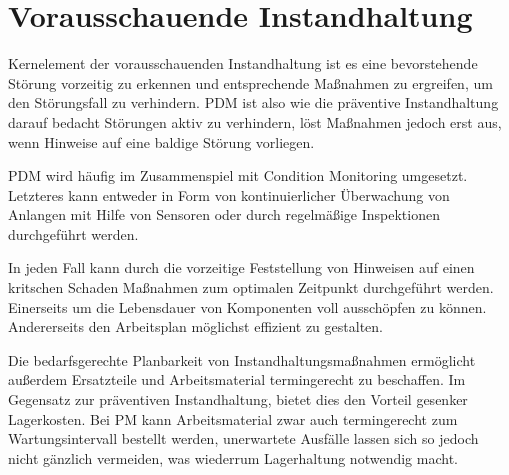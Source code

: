 \chapter{Vorausschauende Instandhaltung}
\label{ch:vorausschauende instandhaltung}

Kernelement der vorausschauenden Instandhaltung ist es eine bevorstehende Störung vorzeitig zu erkennen und entsprechende Maßnahmen zu ergreifen, um den Störungsfall zu verhindern. PDM ist also wie die präventive Instandhaltung darauf bedacht Störungen aktiv zu verhindern, löst Maßnahmen jedoch erst aus, wenn Hinweise auf eine baldige Störung vorliegen.

PDM wird häufig im Zusammenspiel mit Condition Monitoring umgesetzt. Letzteres kann entweder in Form von kontinuierlicher Überwachung von Anlangen mit Hilfe von Sensoren oder durch regelmäßige Inspektionen durchgeführt werden.

In jeden Fall kann durch die vorzeitige Feststellung von Hinweisen auf einen kritschen Schaden Maßnahmen zum optimalen Zeitpunkt durchgeführt werden. Einerseits um die Lebensdauer von Komponenten voll ausschöpfen zu können. Andererseits den Arbeitsplan möglichst effizient zu gestalten.

Die bedarfsgerechte Planbarkeit von Instandhaltungsmaßnahmen ermöglicht außerdem Ersatzteile und Arbeitsmaterial termingerecht zu beschaffen. Im Gegensatz zur präventiven Instandhaltung, bietet dies den Vorteil gesenker Lagerkosten. Bei PM kann Arbeitsmaterial zwar auch termingerecht zum Wartungsintervall bestellt werden, unerwartete Ausfälle lassen sich so jedoch nicht gänzlich vermeiden, was wiederrum Lagerhaltung notwendig macht. 

